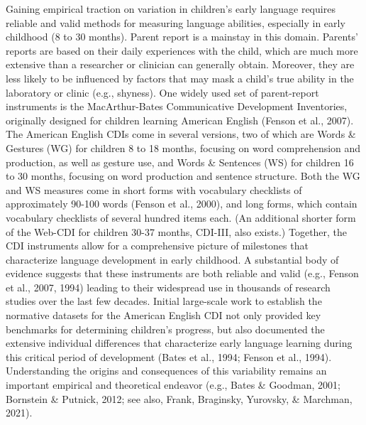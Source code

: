\documentclass[
  english,
  ,man,floatsintext]{apa6}
\begin{document}
Gaining empirical traction on variation in children's early language requires reliable and valid methods for measuring language abilities, especially in early childhood (8 to 30 months). Parent report is a mainstay in this domain. Parents' reports are based on their daily experiences with the child, which are much more extensive than a researcher or clinician can generally obtain. Moreover, they are less likely to be influenced by factors that may mask a child's true ability in the laboratory or clinic (e.g., shyness). One widely used set of parent-report instruments is the MacArthur-Bates Communicative Development Inventories, originally designed for children learning American English (Fenson et al., 2007). The American English CDIs come in several versions, two of which are Words \& Gestures (WG) for children 8 to 18 months, focusing on word comprehension and production, as well as gesture use, and Words \& Sentences (WS) for children 16 to 30 months, focusing on word production and sentence structure. Both the WG and WS measures come in short forms with vocabulary checklists of approximately 90-100 words (Fenson et al., 2000), and long forms, which contain vocabulary checklists of several hundred items each. (An additional shorter form of the Web-CDI for children 30-37 months, CDI-III, also exists.) Together, the CDI instruments allow for a comprehensive picture of milestones that characterize language development in early childhood. A substantial body of evidence suggests that these instruments are both reliable and valid (e.g., Fenson et al., 2007, 1994) leading to their widespread use in thousands of research studies over the last few decades. Initial large-scale work to establish the normative datasets for the American English CDI not only provided key benchmarks for determining children's progress, but also documented the extensive individual differences that characterize early language learning during this critical period of development (Bates et al., 1994; Fenson et al., 1994). Understanding the origins and consequences of this variability remains an important empirical and theoretical endeavor (e.g., Bates \& Goodman, 2001; Bornstein \& Putnick, 2012; see also, Frank, Braginsky, Yurovsky, \& Marchman, 2021).
\end{document}
